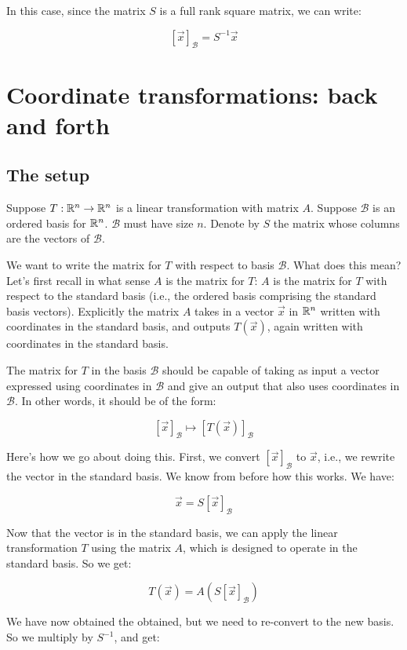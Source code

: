 \documentclass[10pt]{amsart}
\begin{document}
In this case, since the matrix $S$ is a full rank square matrix, we can write:

$$[\vec{x}]_{\mathcal{B}} = S^{-1}\vec{x}$$

\section{Coordinate transformations: back and forth}

\subsection{The setup}

Suppose $T:\mathbb{R}^n \to \mathbb{R}^n$ is a linear transformation with matrix
$A$. Suppose $\mathcal{B}$ is an ordered basis for
$\mathbb{R}^n$. $\mathcal{B}$ must have size $n$. Denote by $S$ the matrix
whose columns are the vectors of $\mathcal{B}$.

We want to write the matrix for $T$ with respect to basis
$\mathcal{B}$. What does this mean? Let's first recall in what sense
$A$ is the matrix for $T$: $A$ is the matrix for $T$ with respect to
the standard basis (i.e., the ordered basis comprising the standard
basis vectors). Explicitly the matrix $A$ takes in a vector $\vec{x}$
in $\mathbb{R}^n$ written with coordinates in the standard basis, and outputs
$T(\vec{x})$, again written with coordinates in the standard basis.

The matrix for $T$ in the basis $\mathcal{B}$ should be capable of
taking as input a vector expressed using coordinates in $\mathcal{B}$
and give an output that also uses coordinates in $\mathcal{B}$. In other words, it should be of the form:

$$[\vec{x}]_{\mathcal{B}} \mapsto [T(\vec{x})]_{\mathcal{B}}$$

Here's how we go about doing this. First, we convert
$[\vec{x}]_{\mathcal{B}}$ to $\vec{x}$, i.e., we rewrite the vector in
the standard basis. We know from before how this works. We have:

$$\vec{x} = S[\vec{x}]_{\mathcal{B}}$$

Now that the vector is in the standard basis, we can apply the linear
transformation $T$ using the matrix $A$, which is designed to operate in the standard basis. So we get:

$$T(\vec{x}) = A(S[\vec{x}]_{\mathcal{B}})$$

We have now obtained the obtained, but we need to re-convert to the new basis. So we multiply by $S^{-1}$, and get:
\end{document}
